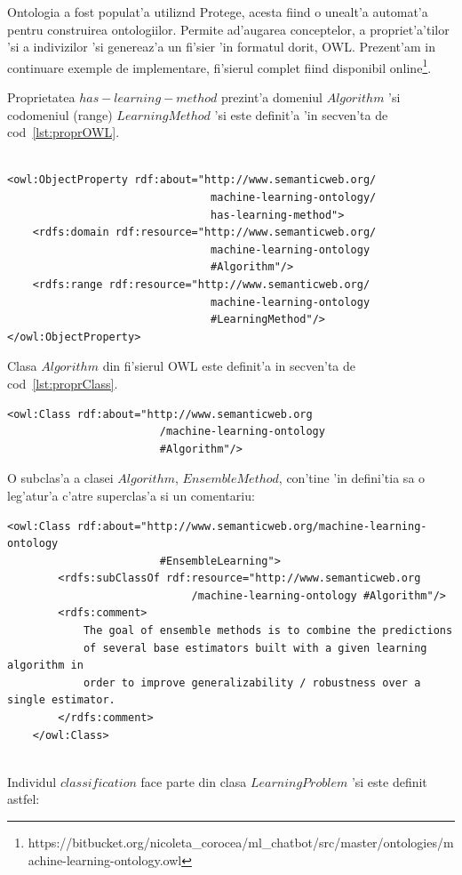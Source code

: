 \documentclass[12pt,a4paper,twoside]{report}
\begin{document}
Ontologia a fost populat'a utiliz\ia nd Protege, acesta fiind o unealt'a automat'a pentru construirea ontologiilor. Permite ad'augarea conceptelor, a propriet'a'tilor 'si a indivizilor 'si genereaz'a un fi'sier 'in formatul dorit, OWL. Prezent'am in continuare exemple de implementare, fi'sierul complet fiind disponibil online\footnote{https://bitbucket.org/nicoleta\_corocea/ml\_chatbot/src/master/ontologies/machine-learning-ontology.owl}.

Proprietatea $has-learning-method$ prezint'a domeniul $Algorithm$ 'si codomeniul (range) $LearningMethod$ 'si este definit'a 'in secven'ta de cod~\ref{lst:proprOWL}.
\begin{lstlisting}[basicstyle=\footnotesize, caption = Proprietatea $has-learning-method$ 'in OWL, label=lst:proprOWL]

<owl:ObjectProperty rdf:about="http://www.semanticweb.org/
                                machine-learning-ontology/
                                has-learning-method">
    <rdfs:domain rdf:resource="http://www.semanticweb.org/
                                machine-learning-ontology
                                #Algorithm"/>
    <rdfs:range rdf:resource="http://www.semanticweb.org/
                                machine-learning-ontology
                                #LearningMethod"/>
</owl:ObjectProperty>
\end{lstlisting}


 Clasa $Algorithm$ din fi'sierul OWL este definit'a in secven'ta de cod~\ref{lst:proprClass}.
\begin{lstlisting}[basicstyle=\footnotesize,caption = Clasa $Algorithm$ 'in OWL, label=lst:proprClass]
    <owl:Class rdf:about="http://www.semanticweb.org
                        /machine-learning-ontology
                        #Algorithm"/>
 \end{lstlisting}   

O subclas'a a clasei $Algorithm$, $EnsembleMethod$, con'tine 'in defini'tia sa o leg'atur'a c'atre superclas'a si un comentariu:
\begin{lstlisting}[basicstyle=\footnotesize, caption = Clasa $Algorithm$ 'in OWL, label=lst:proprClass]
    <owl:Class rdf:about="http://www.semanticweb.org/machine-learning-ontology
                        #EnsembleLearning">
        <rdfs:subClassOf rdf:resource="http://www.semanticweb.org
                             /machine-learning-ontology #Algorithm"/>
        <rdfs:comment>
            The goal of ensemble methods is to combine the predictions
            of several base estimators built with a given learning algorithm in
            order to improve generalizability / robustness over a single estimator.
        </rdfs:comment>
    </owl:Class>
    
\end{lstlisting}
Individul $classification$ face parte din clasa $LearningProblem$ 'si este definit astfel: 
\end{document}
